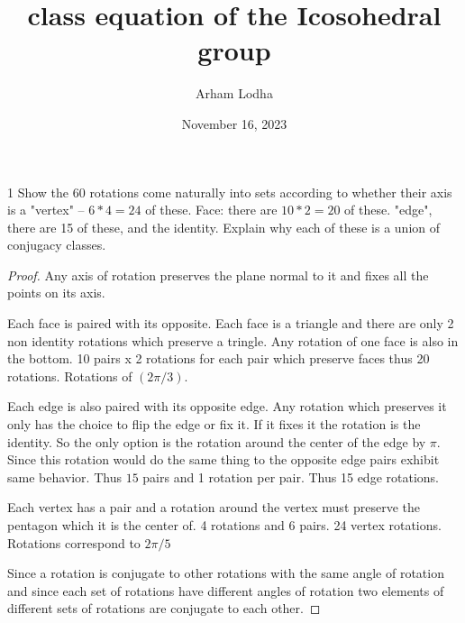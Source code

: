\documentclass{article}
\begin{document}
\title{class equation of the Icosohedral group}
\author{Arham Lodha}%
\date{November 16, 2023}%
\maketitle

\begin{PROB}{1}\label{Problem 1.}
    Show the 60 rotations come naturally into sets according to whether their axis is a "vertex" -- $6 * 4 = 24$ of these.  
    Face: there are $10 * 2 = 20$ of these. 
    "edge", there are 15 of these, and the identity.  
    Explain why each of these is a union of conjugacy classes.
\end{PROB}
\begin{proof}
    Any axis of rotation preserves the plane normal to it and fixes all the points on its axis. 

    Each face is paired with its opposite. Each face is a triangle and there are only 2 non identity rotations which preserve a tringle. Any rotation of one face is also in the bottom. 10 pairs x 2 rotations for each pair which preserve faces thus 20 rotations. Rotations of $(2\pi/3)$.

    Each edge is also paired with its opposite edge. Any rotation which preserves it only has the choice to flip the edge or fix it. If it fixes it the rotation is the identity. So the only option is the rotation around the center of the edge by $\pi$. Since this rotation would do the same thing to the opposite edge pairs exhibit same behavior. Thus $15$ pairs and 1 rotation per pair. Thus 15 edge rotations.
    
    Each vertex has a pair and a rotation around the vertex must preserve the pentagon which it is the center of. 4 rotations and 6 pairs. 24 vertex rotations. Rotations correspond to $2\pi/5$


    Since a rotation is conjugate to other rotations with the same angle of rotation and since each set of rotations have different angles of rotation two elements of different sets of rotations are conjugate to each other.
\end{proof}

\bigskip
\end{document}
